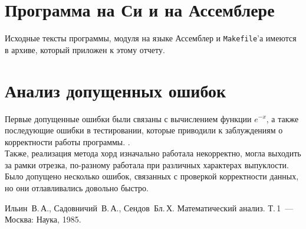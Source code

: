 \documentclass[a4paper,12pt,titlepage,finall]{article}
\begin{document}
\newpage

\section{Программа на Си и на Ассемблере}

Исходные тексты программы, модуля на языке Ассемблер и {\tt Makefile}'а имеются в архиве, который приложен к этому отчету.

\newpage

\section{Анализ допущенных ошибок}
Первые допущенные ошибки были связаны с вычислением функции $e^{-x}$, а также последующие ошибки в тестировании, которые приводили к заблуждениям о корректности работы программы.
.\\

Также, реализация метода хорд изначально работала некорректно, могла выходить за рамки отрезка, по-разному работала при различных характерах выпуклости. Было допущено несколько ошибок, связанных с проверкой корректности данных, но они отлавливались довольно быстро.

\newpage

\begin{raggedright}
\begin{thebibliography}{99}
 Ильин~В.\,А., Садовничий~В.\,А., Сендов~Бл.\,Х. Математический анализ. Т.\,1~---
    Москва: Наука, 1985.
\end{thebibliography}
\end{raggedright}
\end{document}
